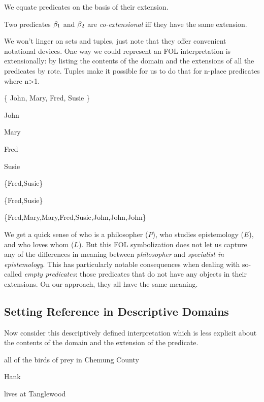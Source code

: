We equate predicates on the basis of their extension.

\begin{definition}[Coextension]
  \label{def:fol-coextension}
  Two predicates $\beta_1$ and $\beta_2$ are  \emph{co-extensional} iff they
  have the same extension.
\end{definition}

We won't linger on sets and tuples, just note that they offer convenient
notational devices. One way we could represent an FOL interpretation is
extensionally: by listing the contents of the domain and the extensions of all
the predicates by rote. Tuples make it possible for us to do that for n-place
predicates where n>1. 

\begin{grayarg}
\item[\textbf{D:}] \{ John, Mary, Fred, Susie \}
  \item[$j$:] John
  \item[$m$:] Mary
  \item[$f$:] Fred
  \item[$s$:] Susie
  \item[$P$:] \{Fred,Susie\}
  \item[$E$:] \{Fred,Susie\}
  \item[$L$:] \{\textlangle Fred,Mary\textrangle,\textlangle Mary,Fred\textrangle,\textlangle Susie,John\textrangle,\textlangle John,John\textrangle\}
\end{grayarg}

We get a quick sense of who is a philosopher ($P$), who studies epistemology
($E$), and who loves whom ($L$). But this FOL symbolization does not let us
capture any of the differences in meaning between \emph{philosopher} and
\emph{specialist in epistemology}. This has particularly notable consequences
when dealing with so-called \emph{empty predicates}: those predicates that do
not have any objects in their extensions. On our approach, they all have the
same meaning.

\subsection{Setting Reference in Descriptive Domains}

Now consider this descriptively defined interpretation which is less explicit
about the contents of the domain and the extension of the predicate.

\begin{argument}
  \item[\textbf{D:}] all of the birds of prey in Chemung County
  \item[$h$:] Hank
  \item[$T$:] lives at Tanglewood
\end{argument}

